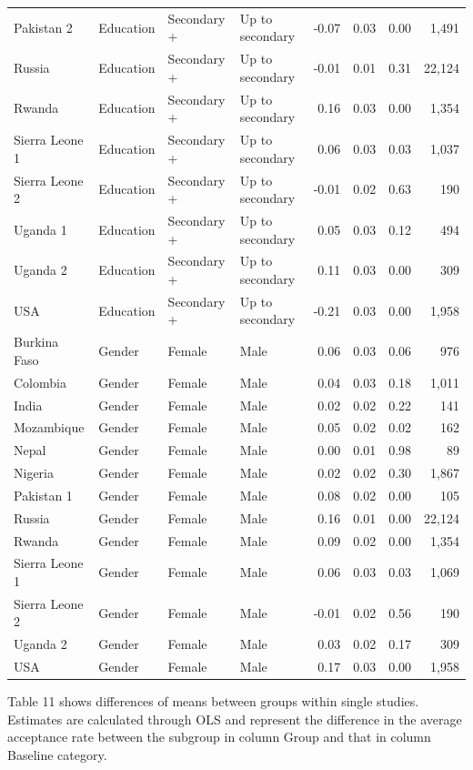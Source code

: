 \documentclass[
  12pt,
]{article}
\begin{document}
\begin{table}
{\begin{threeparttable}
\begin{tabular}[t]{llllrrrr}
Pakistan 2 & Education & Secondary + & Up to secondary & -0.07 & 0.03 & 0.00 & 1,491\\
Russia & Education & Secondary + & Up to secondary & -0.01 & 0.01 & 0.31 & 22,124\\
Rwanda & Education & Secondary + & Up to secondary & 0.16 & 0.03 & 0.00 & 1,354\\
Sierra Leone 1 & Education & Secondary + & Up to secondary & 0.06 & 0.03 & 0.03 & 1,037\\
Sierra Leone 2 & Education & Secondary + & Up to secondary & -0.01 & 0.02 & 0.63 & 190\\
Uganda 1 & Education & Secondary + & Up to secondary & 0.05 & 0.03 & 0.12 & 494\\
Uganda 2 & Education & Secondary + & Up to secondary & 0.11 & 0.03 & 0.00 & 309\\
USA & Education & Secondary + & Up to secondary & -0.21 & 0.03 & 0.00 & 1,958\\
Burkina Faso & Gender & Female & Male & 0.06 & 0.03 & 0.06 & 976\\
Colombia & Gender & Female & Male & 0.04 & 0.03 & 0.18 & 1,011\\
India & Gender & Female & Male & 0.02 & 0.02 & 0.22 & 141\\
Mozambique & Gender & Female & Male & 0.05 & 0.02 & 0.02 & 162\\
Nepal & Gender & Female & Male & 0.00 & 0.01 & 0.98 & 89\\
Nigeria & Gender & Female & Male & 0.02 & 0.02 & 0.30 & 1,867\\
Pakistan 1 & Gender & Female & Male & 0.08 & 0.02 & 0.00 & 105\\
Russia & Gender & Female & Male & 0.16 & 0.01 & 0.00 & 22,124\\
Rwanda & Gender & Female & Male & 0.09 & 0.02 & 0.00 & 1,354\\
Sierra Leone 1 & Gender & Female & Male & 0.06 & 0.03 & 0.03 & 1,069\\
Sierra Leone 2 & Gender & Female & Male & -0.01 & 0.02 & 0.56 & 190\\
Uganda 2 & Gender & Female & Male & 0.03 & 0.02 & 0.17 & 309\\
USA & Gender & Female & Male & 0.17 & 0.03 & 0.00 & 1,958\\
\bottomrule
\end{tabular}
\begin{tablenotes}
\item Table 11 shows differences of means between groups within single studies. Estimates are calculated through OLS and represent the difference in the average acceptance rate between the subgroup in column Group and that in column Baseline category.
\end{tablenotes}
\end{threeparttable}}
\end{table}
\end{document}
